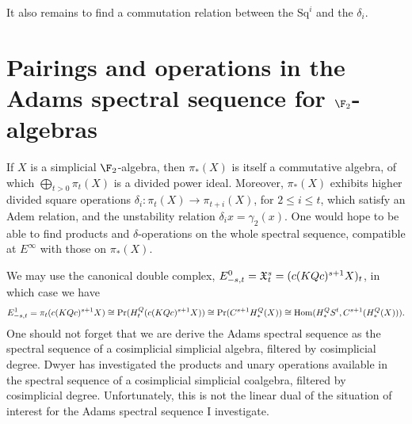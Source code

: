 \documentclass[11pt]{article}
\newcommand{\Sq}{\mathrm{Sq}}
\begin{document}
It also remains to find a commutation relation between the $\Sq^i$ and the $\delta_i$.

\section{Pairings and operations in the Adams spectral sequence for $\F_2$-algebras}
If $X$ is a simplicial $\F_2$-algebra, then $\pi_*(X)$ is itself a commutative algebra, of which $\bigoplus_{t>0}\pi_{t}(X)$ is a divided power ideal. Moreover, $\pi_*(X)$ exhibits higher divided square operations $\delta_i:\pi_t(X)\to \pi_{t+i}(X)$, for $2\leq i \leq t$, which satisfy an Adem relation, and the unstability relation $\delta_ix=\gamma_2(x)$. One would hope to be able to find products and $\delta$-operations on the whole spectral sequence, compatible at $E^\infty$ with those on $\pi_*(X)$.

We may use the canonical double complex, $E^0_{-s,t}=\mathfrak{X}^s_t=(c(KQc)^{s+1}X)_t$, in which case we have 
\[E^1_{-s,t}=\pi_t(c(KQc)^{s+1}X)\cong \textup{Pr}(H_t^Q(c(KQc)^{s+1}X))\cong \textup{Pr}(C^{s+1}H_*^Q(X))\cong \operatorname{Hom}(H_*^QS^t,C^{s+1}(H^Q_*(X))).\]
One should not forget that we are derive the Adams spectral sequence as the spectral sequence of a cosimplicial simplicial algebra, filtered by cosimplicial degree. Dwyer \cite{DwyerHigherDividedSquares.pdf} has investigated the products and unary operations available in the spectral sequence of a cosimplicial simplicial coalgebra, filtered by cosimplicial degree. Unfortunately, this is not the linear dual of the situation of interest for the Adams spectral sequence I investigate.
\end{document}
